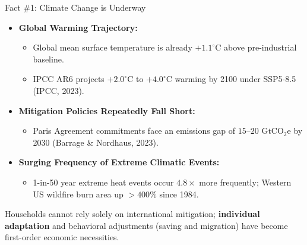\documentclass[aspectratio=169, 10pt]{beamer}
\begin{document}
\begin{frame}{Fact \#1: Climate Change is Underway \hfill \hyperlink{backup:climate_facts}{\scriptsize{}}}\label{main:fact1}
    \begin{itemize}\small
        \item \textbf{Global Warming Trajectory:}
        \begin{itemize}\footnotesize
            \item Global mean surface temperature is already $+1.1^\circ\text{C}$ above pre-industrial baseline.
            \item IPCC AR6 projects $+2.0^\circ\text{C}$ to $+4.0^\circ\text{C}$ warming by 2100 under SSP5-8.5 (IPCC, 2023).
        \end{itemize}
        \vspace{0.06cm}
        \item \textbf{Mitigation Policies Repeatedly Fall Short:}
        \begin{itemize}\footnotesize
            \item Paris Agreement commitments face an emissions gap of $15\text{--}20\text{ GtCO}_2\text{e}$ by 2030 (Barrage \& Nordhaus, 2023).
        \end{itemize}
        \vspace{0.06cm}
        \item \textbf{Surging Frequency of Extreme Climatic Events:}
        \begin{itemize}\footnotesize
            \item 1-in-50 year extreme heat events occur $4.8\times$ more frequently; Western US wildfire burn area up $>400\%$ since 1984.
        \end{itemize}
    \end{itemize}
    \vspace{0.1cm}
    \begin{tcolorbox}[takeawaybox, title=Economic Implication]
        \footnotesize Households cannot rely solely on international mitigation; \textbf{individual adaptation} and behavioral adjustments (saving and migration) have become first-order economic necessities.
    \end{tcolorbox}
\end{frame}
\end{document}
